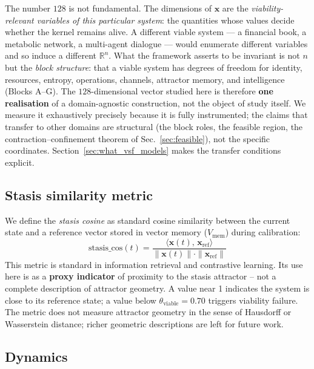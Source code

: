 \documentclass[11pt, a4paper]{article}
\newcommand{\R}{\mathbb{R}}
\newcommand{\sv}{\bm{x}}
\begin{document}
The number $128$ is not fundamental. The dimensions of $\sv$ are the
\emph{viability-relevant variables of this particular system}: the quantities
whose values decide whether the kernel remains alive. A different viable
system --- a financial book, a metabolic network, a multi-agent dialogue ---
would enumerate different variables and so induce a different $\R^n$. What the
framework asserts to be invariant is not $n$ but the \emph{block structure}:
that a viable system has degrees of freedom for identity, resources, entropy,
operations, channels, attractor memory, and intelligence (Blocks A--G). The
$128$-dimensional vector studied here is therefore \textbf{one realisation} of a
domain-agnostic construction, not the object of study itself. We measure it
exhaustively precisely because it is fully instrumented; the claims that
transfer to other domains are structural (the block roles, the feasible region,
the contraction--confinement theorem of Sec.~\ref{sec:feasible}), not the
specific coordinates. Section~\ref{sec:what_vsf_models} makes the transfer
conditions explicit.

\subsection{Stasis similarity metric}
\label{sec:stasis_cos}

We define the \emph{stasis cosine} as standard cosine similarity between
the current state and a reference vector stored in vector memory ($V_\text{mem}$)
during calibration:
\begin{equation}
  \text{stasis\_cos}(t)
    = \frac{\langle \sv(t),\, \sv_\text{ref} \rangle}
           {\|\sv(t)\| \cdot \|\sv_\text{ref}\|}
  \label{eq:stasis_cos}
\end{equation}
This metric is standard in information retrieval and contrastive learning.
Its use here is as a \textbf{proxy indicator} of proximity to the stasis
attractor -- not a complete description of attractor geometry.
A value near 1 indicates the system is close to its reference state;
a value below $\theta_\text{viable} = 0.70$ triggers viability failure.
The metric does not measure attractor geometry in the sense of Hausdorff or
Wasserstein distance; richer geometric descriptions are left for future work.

\subsection{Dynamics}
\end{document}
